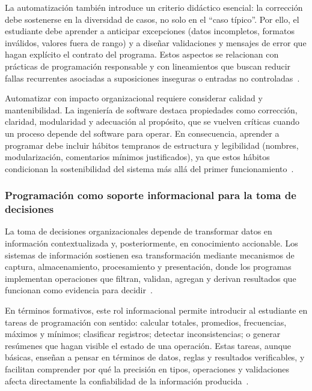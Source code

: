 \documentclass[12pt,twoside]{book}
\begin{document}
						La automatización también introduce un criterio didáctico esencial: la corrección debe sostenerse en la diversidad de casos, no solo en el “caso típico”. Por ello, el estudiante debe aprender a anticipar excepciones (datos incompletos, formatos inválidos, valores fuera de rango) y a diseñar validaciones y mensajes de error que hagan explícito el contrato del programa. Estos aspectos se relacionan con prácticas de programación responsable y con lineamientos que buscan reducir fallas recurrentes asociadas a suposiciones inseguras o entradas no controladas~\cite{ISO247722024Programming,Gaddis2022Starting,Ghezzi2003Fundamentals}.
						
						Automatizar con impacto organizacional requiere considerar calidad y mantenibilidad. La ingeniería de software destaca propiedades como corrección, claridad, modularidad y adecuación al propósito, que se vuelven críticas cuando un proceso depende del software para operar. En consecuencia, aprender a programar debe incluir hábitos tempranos de estructura y legibilidad (nombres, modularización, comentarios mínimos justificados), ya que estos hábitos condicionan la sostenibilidad del sistema más allá del primer funcionamiento~\cite{Ghezzi2003Fundamentals,Fitzpatrick2004Software,Kendall2014Systems}.
						
					\subsubsection{Programación como soporte informacional para la toma de decisiones}
						\noindent
						La toma de decisiones organizacionales depende de transformar datos en información contextualizada y, posteriormente, en conocimiento accionable. Los sistemas de información sostienen esa transformación mediante mecanismos de captura, almacenamiento, procesamiento y presentación, donde los programas implementan operaciones que filtran, validan, agregan y derivan resultados que funcionan como evidencia para decidir~\cite{Laudon2020Management,Bernstein2009Data,Calzati2025Ecosystemic}.
						
						En términos formativos, este rol informacional permite introducir al estudiante en tareas de programación con sentido: calcular totales, promedios, frecuencias, máximos y mínimos; clasificar registros; detectar inconsistencias; o generar resúmenes que hagan visible el estado de una operación. Estas tareas, aunque básicas, enseñan a pensar en términos de datos, reglas y resultados verificables, y facilitan comprender por qué la precisión en tipos, operaciones y validaciones afecta directamente la confiabilidad de la información producida~\cite{Gaddis2022Starting,Bernstein2009Data,Hanly2015Problem}.
						
\end{document}

